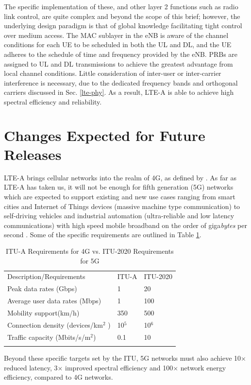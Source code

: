 The specific implementation of these, and other layer 2 functions such as radio link control, are quite complex and beyond the scope of this brief; however, the underlying design paradigm is that of global knowledge facilitating tight control over medium access. The MAC sublayer in the eNB is aware of the channel conditions for each UE to be scheduled in both the UL and DL, and the UE adheres to the schedule of time and frequency provided by the eNB.  PRBs are assigned to UL and DL transmissions to achieve the greatest advantage from local channel conditions. Little consideration of inter-user or inter-carrier interference is necessary, due to the dedicated frequency bands and orthogonal carriers discussed in Sec. \ref{lte-phy}.  As a result, LTE-A is able to achieve high spectral efficiency and reliability.


\section {Changes Expected for Future Releases}
\label{fut-chnge}
LTE-A brings cellular networks into the realm of 4G, as defined by \cite{itu-advanced}.  As far as LTE-A has taken us, it will not be enough for fifth generation (5G) networks which are expected to support existing and new use cases ranging from smart cities and Internet of Things devices (massive machine type communication) to self-driving vehicles and industrial automation (ultra-reliable and low latency communications) with  high speed mobile broadband on the order of giga\emph{bytes} per second \cite{itu-2020}.  Some of the specific requirements are outlined in Table \ref{5g-table}.
\begin{table}
	\caption{ITU-A Requirements for 4G vs. ITU-2020 Requirements for 5G  \cite{itu-2020}}
	\label{5g-table}      
	\begin{tabular}{p{}p{}p{}}
		\hline\noalign{\smallskip}
		Description/Requirements & ITU-A & ITU-2020  \\
		\noalign{\smallskip}\svhline\noalign{\smallskip}
		Peak data rates (Gbps) & 1  & 20\\
		Average user data rates (Mbps) & 1  & 100  \\				
		Mobility support(km/h) & 350  & 500 \\
		Connection density (devices/km$^2$ )& 10$^5$ & 10$^6$ \\
		Traffic capacity (Mbits/s/m$^2$) & 0.1 & 10 \\
		\noalign{\smallskip}\hline\noalign{\smallskip}
	\end{tabular}
		
\end{table}
Beyond these specific targets set by the ITU, 5G networks must also achieve 10$\times$ reduced latency, 3$\times$ improved spectral efficiency and  100$\times$ network energy efficiency, compared to 4G networks. 

